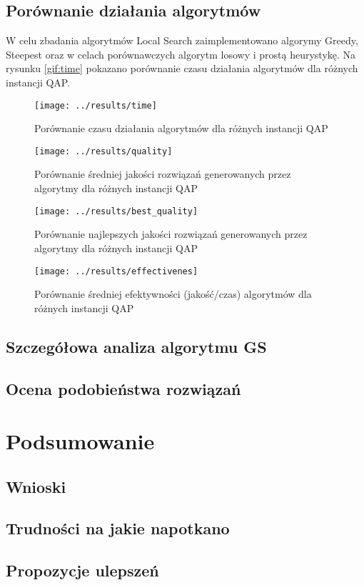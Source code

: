 \documentclass{article}
\begin{document}
	\subsection{Porównanie działania algorytmów}
		W celu zbadania algorytmów Local Search zaimplementowano algorymy Greedy, Steepest oraz w celach porównawczych algorytm losowy i prostą heurystykę. Na rysunku \ref{gif:time} pokazano porównanie czasu działania algorytmów dla różnych instancji QAP.
		\begin{figure}
			\texttt{[image: ../results/time]}
			\caption{Porównanie czasu działania algorytmów dla różnych instancji QAP\label{fig:time}}
		\end{figure}

		\begin{figure}
			\texttt{[image: ../results/quality]}
			\caption{Porównanie średniej jakości rozwiązań generowanych przez algorytmy dla różnych instancji QAP\label{fig:quality}}
		\end{figure}

	 	\begin{figure}
			\texttt{[image: ../results/best\_quality]}
			\caption{Porównanie najlepszych jakości rozwiązań generowanych przez algorytmy dla różnych instancji QAP\label{fig:best_quality}}
		\end{figure}

		\begin{figure}
			\texttt{[image: ../results/effectivenes]}
			\caption{Porównanie średniej efektywności (jakość/czas) algorytmów dla różnych instancji QAP\label{fig:effectivenes}}
		\end{figure}


	\subsection{Szczegółowa analiza algorytmu GS}
	\subsection{Ocena podobieństwa rozwiązań}
\section{Podsumowanie}
	\subsection{Wnioski}
	\subsection{Trudności na jakie napotkano}
	\subsection{Propozycje ulepszeń}




\end{document}
